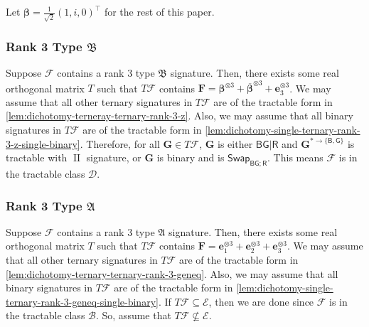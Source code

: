 \documentclass[11pt]{article}
\DeclareMathOperator{\typeii}{II}
\newcommand{\db}{\mathsf{B}}
\newcommand{\dg}{\mathsf{G}}
\newcommand{\dr}{\mathsf{R}}
\newcommand{\swhelper}[1]{$\mathsf{Swap}_{#1}$\xspace}
\newcommand{\swbg}{\swhelper{\db \dg; \dr}}
\newcommand{\teh}{^{\otimes 3}}
\newcommand{\transpose}{^\intercal}
\newcommand{\domres}[1]{
  ^{*\to\{#1\}}
}
\newcommand{\tractE}{$\mathscr{B}$\xspace}
\newcommand{\tractBGR}{$\mathscr{D}$\xspace}
\newcommand{\ternarytractgeneq}{$\mathfrak{A}$\xspace}
\newcommand{\ternarytractz}{$\mathfrak{B}$\xspace}
\begin{document}
Let $\boldsymbol{\beta} = \frac{1}{\sqrt{2}}(1, i, 0)\transpose$ for the rest of this paper.

\subsubsection{
Rank 3 Type \texorpdfstring{\ternarytractz}{B}
}\label{subsec:contains-rank-3-z}

Suppose $\mathcal{F}$ contains a rank $3$ type \ternarytractz signature.
Then, there exists some real orthogonal matrix $T$ such that $T \mathcal{F}$ contains $\mathbf{F} = \boldsymbol{\beta}\teh + \overline{\boldsymbol{\beta}}\teh + \mathbf{e}_3\teh $.
We may assume that all other ternary signatures in $T \mathcal{F}$ are of the tractable form in \cref{lem:dichotomy-terneray-ternary-rank-3-z}.
Also, we may assume that all binary signatures in $T \mathcal{F}$ are of the tractable form in \cref{lem:dichotomy-single-ternary-rank-3-z-single-binary}.
Therefore, for all $\mathbf{G} \in T \mathcal{F}$, $\mathbf{G}$ is either $\db \dg | \dr$ and $\mathbf{G} \domres{\db, \dg}$ is tractable with $\typeii$ signature, or $\mathbf{G}$ is binary and is \swbg. 
This means $\mathcal{F}$ is in the tractable class \tractBGR.


\subsubsection{
Rank 3 Type \texorpdfstring{\ternarytractgeneq}{A}
}\label{subsec:contains-rank-3-geneq}

Suppose $\mathcal{F}$ contains a rank $3$ type \ternarytractgeneq signature.
Then, there exists some real orthogonal matrix $T$ such that $T \mathcal{F}$ contains $\mathbf{F} = \mathbf{e}_1\teh + \mathbf{e}_2 \teh + \mathbf{e}_3 \teh$.   
We may assume that all other ternary signatures in $T \mathcal{F}$ are of the tractable form in \cref{lem:dichotomy-ternary-ternary-rank-3-geneq}.
Also, we may assume that all binary signatures in $T \mathcal{F}$ are of the tractable form in \cref{lem:dichotomy-single-ternary-rank-3-geneq-single-binary}.
If $T \mathcal{F} \subseteq \mathcal{E}$, then we are done since $\mathcal{F}$ is in the tractable class \tractE.
So, assume that $T \mathcal{F} \not \subseteq \mathcal{E}$.
\end{document}
